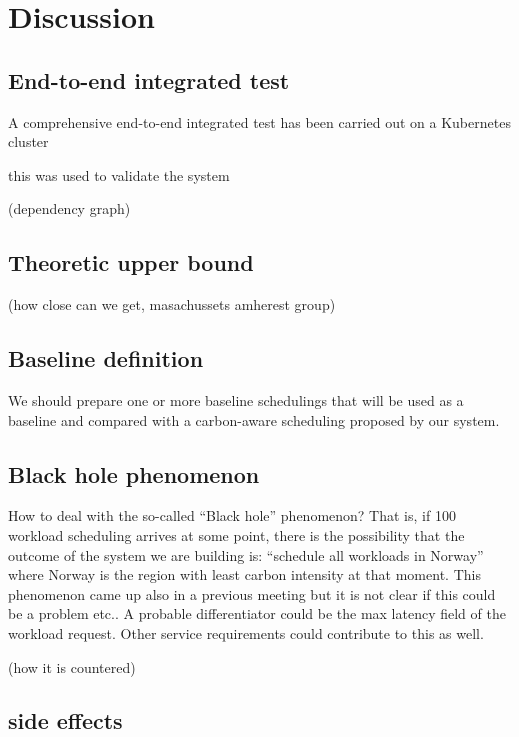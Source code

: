 \chapter{Discussion}
\label{cha:discussion}

\section{End-to-end integrated test}

A comprehensive end-to-end integrated test has been carried out on a Kubernetes cluster

this was used to validate the system

(dependency graph)

\section{Theoretic upper bound}

 (how close can we get, masachussets amherest group)

\section{Baseline definition}

We should prepare one or more baseline schedulings that will be used as a baseline and compared with a carbon-aware scheduling proposed by our system.

\section{Black hole phenomenon}

How to deal with the so-called “Black hole” phenomenon?
That is, if 100 workload scheduling arrives at some point, there is the possibility that the outcome of the system we are building is: “schedule all workloads in Norway” where Norway is the region with least carbon intensity at that moment.
This phenomenon came up also in a previous meeting but it is not clear if this could be a problem etc..
A probable differentiator could be the max latency field of the workload request. Other service requirements could contribute to this as well.


(how it is countered)

\section{side effects}

